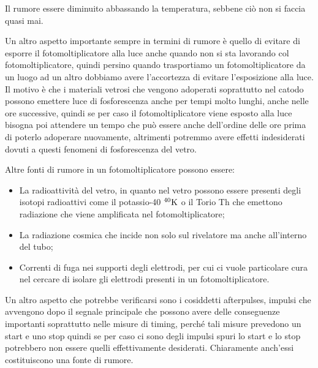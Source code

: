 Il rumore essere diminuito abbassando la temperatura, sebbene ciò non si faccia quasi mai. 

Un altro aspetto importante sempre in termini di rumore è quello di evitare di esporre il fotomoltiplicatore alla luce anche quando non si sta lavorando col fotomoltiplicatore, quindi persino quando trasportiamo un fotomoltiplicatore da un luogo ad un altro dobbiamo avere l'accortezza di evitare l'esposizione alla luce. Il motivo è che i materiali vetrosi che vengono adoperati soprattutto nel catodo possono emettere luce di fosforescenza anche per tempi molto lunghi, anche nelle ore successive, quindi se per caso il fotomoltiplicatore viene esposto alla luce bisogna poi attendere un tempo che può essere anche dell'ordine delle ore prima di poterlo adoperare nuovamente, altrimenti potremmo avere effetti indesiderati dovuti a questi fenomeni di fosforescenza del vetro. 

Altre fonti di rumore in un fotomoltiplicatore possono essere:

\begin{itemize}[leftmargin=0.5cm]
   \item La radioattività del vetro, in quanto nel vetro possono essere presenti degli isotopi radioattivi come il potassio-40 $\rm ^{40}K$ o il Torio Th che emettono radiazione che viene amplificata nel fotomoltiplicatore;
   \item La radiazione cosmica che incide non solo sul rivelatore ma anche all'interno del tubo;
   \item Correnti di fuga nei supporti degli elettrodi, per cui ci vuole particolare cura nel cercare di isolare gli elettrodi presenti in un fotomoltiplicatore.
\end{itemize}

Un altro aspetto che potrebbe verificarsi sono i cosiddetti afterpulses, impulsi che avvengono dopo il segnale principale che possono avere delle conseguenze importanti soprattutto nelle misure di timing, perché tali misure prevedono un start e uno stop quindi se per caso ci sono degli impulsi spuri lo start e lo stop potrebbero non essere quelli effettivamente desiderati. Chiaramente anch'essi costituiscono una fonte di rumore.

